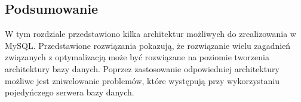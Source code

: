 \subsection{Podsumowanie}
W tym rozdziale przedstawiono kilka architektur możliwych do zrealizowania w MySQL. Przedstawione rozwiązania pokazują, że rozwiązanie wielu zagadnień związanych z optymalizacją może być rozwiązane na poziomie tworzenia architektury bazy danych. Poprzez zastosowanie odpowiedniej architektury możliwe jest zniwelowanie problemów, które występują przy wykorzystaniu pojedyńczego serwera bazy danych. 